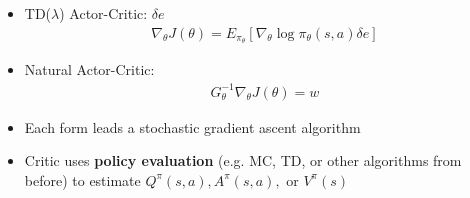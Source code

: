 \documentclass[12pt]{article}
\begin{document}
\begin{itemize}
\begin{itemize}
    \item TD($\lambda$) Actor-Critic: $\delta e$
    \begin{gather*}
      \nabla_\theta J(\theta) = E_{\pi_\theta}[\nabla_\theta \log \pi_\theta (s, a) \delta e]
    \end{gather*}
    \item Natural Actor-Critic:
    \begin{gather*}
      G_\theta^{-1}\nabla_\theta J(\theta) = w
    \end{gather*}
    \item Each form leads a stochastic gradient ascent algorithm
    \item Critic uses \textbf{policy evaluation} (e.g. MC, TD, or other algorithms from before)
    to estimate $Q^\pi(s,a), A^\pi(s,a),$ or $V^\pi(s)$
  \end{itemize}
\end{itemize}
\end{document}
